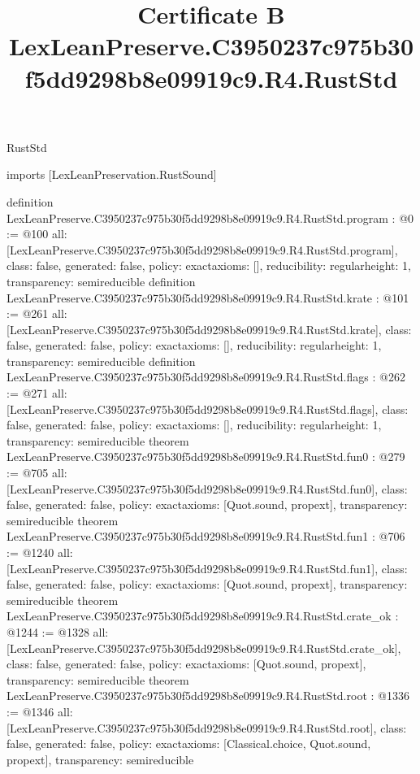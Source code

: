 \begin{lexlean}{RustStd}
\title{Certificate B LexLeanPreserve.C3950237c975b30f5dd9298b8e09919c9.R4.RustStd}
\begin{coremodule}
imports [LexLeanPreservation.RustSound]

definition LexLeanPreserve.C3950237c975b30f5dd9298b8e09919c9.R4.RustStd.program : @0 := @100 {
  all: [LexLeanPreserve.C3950237c975b30f5dd9298b8e09919c9.R4.RustStd.program],
  class: false,
  generated: false,
  policy: exact{axioms: []},
  reducibility: regular{height: 1},
  transparency: semireducible
}
definition LexLeanPreserve.C3950237c975b30f5dd9298b8e09919c9.R4.RustStd.krate : @101 := @261 {
  all: [LexLeanPreserve.C3950237c975b30f5dd9298b8e09919c9.R4.RustStd.krate],
  class: false,
  generated: false,
  policy: exact{axioms: []},
  reducibility: regular{height: 1},
  transparency: semireducible
}
definition LexLeanPreserve.C3950237c975b30f5dd9298b8e09919c9.R4.RustStd.flags : @262 := @271 {
  all: [LexLeanPreserve.C3950237c975b30f5dd9298b8e09919c9.R4.RustStd.flags],
  class: false,
  generated: false,
  policy: exact{axioms: []},
  reducibility: regular{height: 1},
  transparency: semireducible
}
theorem LexLeanPreserve.C3950237c975b30f5dd9298b8e09919c9.R4.RustStd.fun0 : @279 := @705 {
  all: [LexLeanPreserve.C3950237c975b30f5dd9298b8e09919c9.R4.RustStd.fun0],
  class: false,
  generated: false,
  policy: exact{axioms: [Quot.sound, propext]},
  transparency: semireducible
}
theorem LexLeanPreserve.C3950237c975b30f5dd9298b8e09919c9.R4.RustStd.fun1 : @706 := @1240 {
  all: [LexLeanPreserve.C3950237c975b30f5dd9298b8e09919c9.R4.RustStd.fun1],
  class: false,
  generated: false,
  policy: exact{axioms: [Quot.sound, propext]},
  transparency: semireducible
}
theorem LexLeanPreserve.C3950237c975b30f5dd9298b8e09919c9.R4.RustStd.crate_ok : @1244 := @1328 {
  all: [LexLeanPreserve.C3950237c975b30f5dd9298b8e09919c9.R4.RustStd.crate_ok],
  class: false,
  generated: false,
  policy: exact{axioms: [Quot.sound, propext]},
  transparency: semireducible
}
theorem LexLeanPreserve.C3950237c975b30f5dd9298b8e09919c9.R4.RustStd.root : @1336 := @1346 {
  all: [LexLeanPreserve.C3950237c975b30f5dd9298b8e09919c9.R4.RustStd.root],
  class: false,
  generated: false,
  policy: exact{axioms: [Classical.choice, Quot.sound, propext]},
  transparency: semireducible
}


\end{coremodule}
\end{lexlean}
